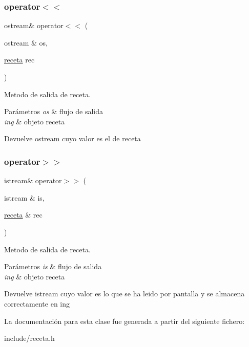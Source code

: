 \subsubsection{\texorpdfstring{operator$<$$<$}{operator<<}}
{\footnotesize\ttfamily ostream\& operator$<$$<$ (\begin{DoxyParamCaption}\item[{ostream \&}]{os,  }\item[{\hyperlink{classreceta}{receta}}]{rec }\end{DoxyParamCaption})\hspace{0.3cm}{\ttfamily [friend]}}



Metodo de salida de receta. 


\begin{DoxyParams}{Parámetros}
{\em os} & flujo de salida \\
\hline
{\em ing} & objeto receta \\
\hline
\end{DoxyParams}
\begin{DoxyReturn}{Devuelve}
ostream cuyo valor es el de receta 
\end{DoxyReturn}
\mbox{\label{classreceta_a750ed3578c2a28e15b64bb9917420269}} 
\subsubsection{\texorpdfstring{operator$>$$>$}{operator>>}}
{\footnotesize\ttfamily istream\& operator$>$$>$ (\begin{DoxyParamCaption}\item[{istream \&}]{is,  }\item[{\hyperlink{classreceta}{receta} \&}]{rec }\end{DoxyParamCaption})\hspace{0.3cm}{\ttfamily [friend]}}



Metodo de salida de receta. 


\begin{DoxyParams}{Parámetros}
{\em is} & flujo de salida \\
\hline
{\em ing} & objeto receta \\
\hline
\end{DoxyParams}
\begin{DoxyReturn}{Devuelve}
istream cuyo valor es lo que se ha leido por pantalla y se almacena correctamente en ing 
\end{DoxyReturn}


La documentación para esta clase fue generada a partir del siguiente fichero\+:\begin{DoxyCompactItemize}
\item 
include/receta.\+h\end{DoxyCompactItemize}

